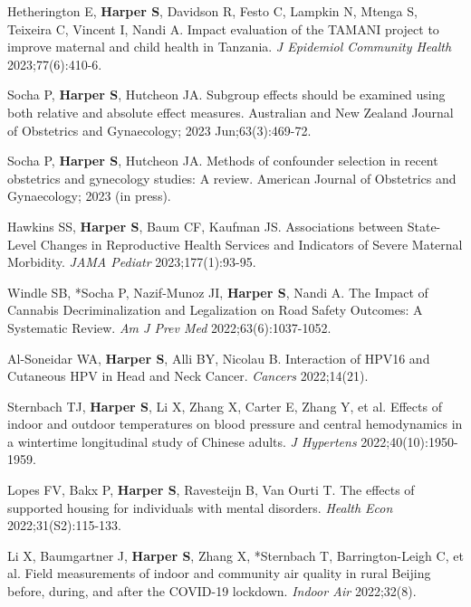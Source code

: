 \documentclass[
  letterpaper,
  DIV=11,
  numbers=noendperiod]{scrartcl}
\begin{document}
\begin{etaremune}
\item *Hetherington E, \textbf{Harper S}, Davidson R, Festo C, Lampkin N, Mtenga S, Teixeira C, Vincent I, Nandi A. Impact evaluation of the TAMANI project to improve maternal and child health in Tanzania. \emph{J Epidemiol Community Health} 2023;77(6):410-6. 

\item *Socha P, \textbf{Harper S}, Hutcheon JA. Subgroup effects should be examined using both relative and absolute effect measures. Australian and New Zealand Journal of Obstetrics and Gynaecology; 2023 Jun;63(3):469-72. 

\item *Socha P, \textbf{Harper S}, Hutcheon JA. Methods of confounder selection in recent obstetrics and gynecology studies: A review. American Journal of Obstetrics and Gynaecology; 2023 (in press).

\item Hawkins SS, \textbf{Harper S}, Baum CF, Kaufman JS. Associations between State-Level Changes in Reproductive Health Services and Indicators of Severe Maternal Morbidity. \emph{JAMA Pediatr} 2023;177(1):93-95.

\item Windle SB, *Socha P, Nazif-Munoz JI, \textbf{Harper S}, Nandi A. The Impact of Cannabis Decriminalization and Legalization on Road Safety Outcomes: A Systematic Review. \emph{Am J Prev Med} 2022;63(6):1037-1052.

\item *Al-Soneidar WA, \textbf{Harper S}, Alli BY, Nicolau B. Interaction of HPV16 and Cutaneous HPV in Head and Neck Cancer. \emph{Cancers} 2022;14(21).

\item *Sternbach TJ, \textbf{Harper S}, Li X, Zhang X, Carter E, Zhang Y, et al. Effects of indoor and outdoor temperatures on blood pressure and central hemodynamics in a wintertime longitudinal study of Chinese adults. \emph{J Hypertens} 2022;40(10):1950-1959.

\item *Lopes FV, Bakx P, \textbf{Harper S}, Ravesteijn B, Van Ourti T. The effects of supported housing for individuals with mental disorders. \emph{Health Econ} 2022;31(S2):115-133.

\item Li X, Baumgartner J, \textbf{Harper S}, Zhang X, *Sternbach T, Barrington-Leigh C, et al. Field measurements of indoor and community air quality in rural Beijing before, during, and after the COVID-19 lockdown. \emph{Indoor Air} 2022;32(8).


\end{etaremune}
\end{document}
